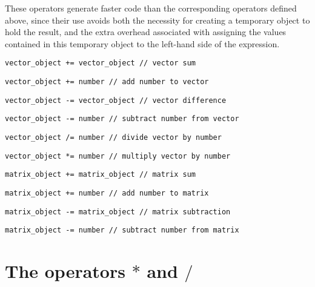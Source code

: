 \documentclass{admbmanual}
\begin{document}
These operators generate faster code than the corresponding operators defined
above, since their use avoids both the necessity for creating a temporary object
to hold the result, and the extra overhead associated with assigning the values
contained in this temporary object to the left-hand side of the expression.
\begin{lstlisting}
vector_object += vector_object // vector sum
\end{lstlisting}
\begin{lstlisting}
vector_object += number // add number to vector
\end{lstlisting}
\begin{lstlisting}
vector_object -= vector_object // vector difference
\end{lstlisting}
\begin{lstlisting}
vector_object -= number // subtract number from vector
\end{lstlisting}
\begin{lstlisting}
vector_object /= number // divide vector by number
\end{lstlisting}
\begin{lstlisting}
vector_object *= number // multiply vector by number
\end{lstlisting}
\begin{lstlisting}
matrix_object += matrix_object // matrix sum
\end{lstlisting}
\begin{lstlisting}
matrix_object += number // add number to matrix
\end{lstlisting}
\begin{lstlisting}
matrix_object -= matrix_object // matrix subtraction
\end{lstlisting}
\begin{lstlisting}
matrix_object -= number // subtract number from matrix
\end{lstlisting}

\section{The operators $*$ and  $/$}
\X{$/$}
\end{document}
